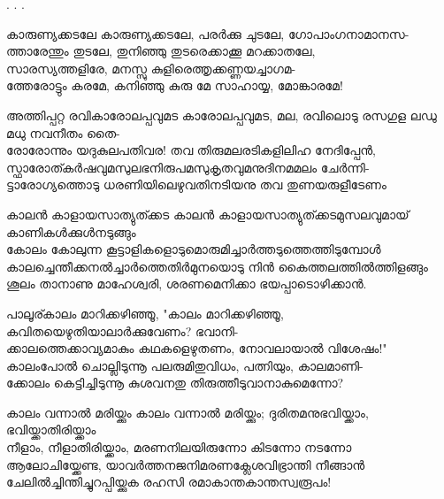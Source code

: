 \begin{enumerate}


.
.
.

\begin{slokam}{\VSv}{\VKG}{കാരുണ്യക്കടലേ}
കാരുണ്യക്കടലേ, പരർക്കു ചുടലേ, ഗോപാംഗനാമാനസ-\\
ത്താരേന്തും തുടലേ, തുനിഞ്ഞു തുടരെക്കാക്കൂ മറക്കാതലേ,\\
സാരസ്യത്തളിരേ, മനസ്സു കുളിരെത്തൃക്കണ്ണയച്ചാഗമ-\\
ത്തേരോട്ടും കരമേ, കനിഞ്ഞു കുരു മേ സാഹായ്യ, മോങ്കാരമേ!
\end{slokam}


\begin{slokam}{\VOth}{അത്തിപ്പറ്റ രവി}{കാരോലപ്പവുമട}
കാരോലപ്പവുമട, മല, രവിലൊടു രസഗുള ലഡു മധു നവനീതം തൈ-\\
രോരോന്നും യദുകുലപതിവര! തവ തിരുമലരടികളിലിഹ നേദിപ്പേൻ,\\
സ്ഫാരോത്കർഷവുമസുലഭനിരുപമസുകൃതവുമനുദിനമമലം ചേർന്നി-\\
ട്ടാരോഗ്യത്തൊടു ധരണിയിലെഴുവതിനടിയനു തവ തുണയരുളീടേണം
\end{slokam}


\begin{slokam}{\VSr}{\VNM}{കാലൻ കാളായസാത്യുത്ക്കട}
കാലൻ കാളായസാത്യുത്ക്കടമുസലവുമായ്‌ കാണികള്‍ക്കുള്‍നടുങ്ങും\\
കോലം കോലുന്ന കൂട്ടാളികളൊടുമൊരുമിച്ചാർത്തടുത്തെത്തിടുമ്പോള്‍\\
കാലച്ചെന്തീക്കനൽച്ചാർത്തെതിർമുനയൊടു നിൻ കൈത്തലത്തിൽത്തിളങ്ങും\\
ശൂലം താനാണു മാഹേശ്വരി, ശരണമെനിക്കാ ഭയപ്പാടൊഴിക്കാൻ.
\end{slokam}


\begin{slokam}{\VSr}{പാലൂര്}{കാലം മാറിക്കഴിഞ്ഞൂ,}
"കാലം മാറിക്കഴിഞ്ഞൂ, കവിതയെഴുതിയാലാർക്കുവേണം? ഭവാനി-\\
ക്കാലത്തെക്കാവ്യമാകും കഥകളെഴുതണം, നോവലായാൽ വിശേഷം!" \\
കാലംപോൽ ചൊല്ലിടുന്നൂ പലരുമിതുവിധം, പത്നിയും, കാലമാണി-\\
ക്കോലം കെട്ടിച്ചിടുന്നൂ കുശവനതു തിരുത്തീടുവാനാകുമെന്നോ?
\end{slokam}



\begin{slokam}{\VSr}{\VKG}{കാലം വന്നാൽ മരിയ്ക്കും}
കാലം വന്നാൽ മരിയ്ക്കും; ദുരിതമനുഭവിയ്ക്കാം, ഭവിയ്ക്കാതിരിയ്ക്കാം\\
നീളാം, നീളാതിരിയ്ക്കാം, മരണനിലയിരുന്നോ കിടന്നോ നടന്നോ\\
ആലോചിയ്ക്കേണ്ട, യാവർത്തനജനിമരണക്ലേശവിഭ്രാന്തി നീങ്ങാൻ\\
ചേലിൽച്ചിന്തിച്ചുറപ്പിയ്ക്കുക രഹസി രമാകാന്തകാന്തസ്വരൂപം!
\end{slokam}



\end{enumerate}
